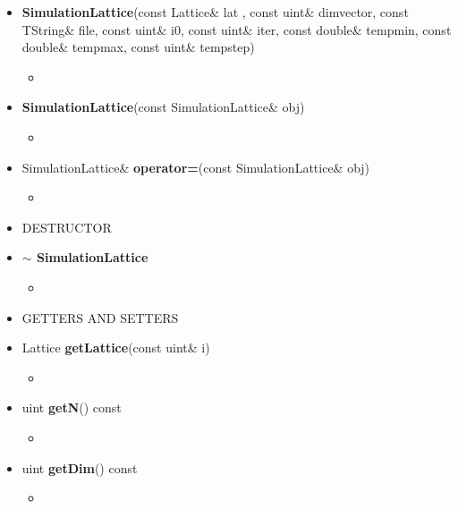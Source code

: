 \begin{itemize}
\begin{itemize}
			\item[] \textbf{SimulationLattice}(const Lattice\& \textunderscore lat , const uint\& \textunderscore dim\textunderscore vector, const TString\& \textunderscore file, const uint\& \textunderscore i0, const uint\& \textunderscore iter, const double\& \textunderscore tempmin, const double\& \textunderscore tempmax, const uint\& \textunderscore tempstep)
			\begin{itemize}
				\item[]
			\end{itemize}

			\item[] \textbf{SimulationLattice}(const SimulationLattice\& obj)
			\begin{itemize}
				\item[]
			\end{itemize}

			\item[] SimulationLattice\& \textbf{operator=}(const SimulationLattice\& obj)
			\begin{itemize}
				\item[]
			\end{itemize}

		\item[] DESTRUCTOR \\

			\item[] \textbf{$\sim$ SimulationLattice}
			\begin{itemize}
				\item[]
			\end{itemize}

		\item[] GETTERS AND SETTERS \\

 			\item[] Lattice \textbf{getLattice}(const uint\& i)
			\begin{itemize}
				\item[]
			\end{itemize}

			\item[]  uint \textbf{getN}() const
			\begin{itemize}
				\item[]
			\end{itemize}

			\item[]  uint \textbf{getDim}() const
			\begin{itemize}
				\item[]
			\end{itemize}


\end{itemize}
\end{itemize}
